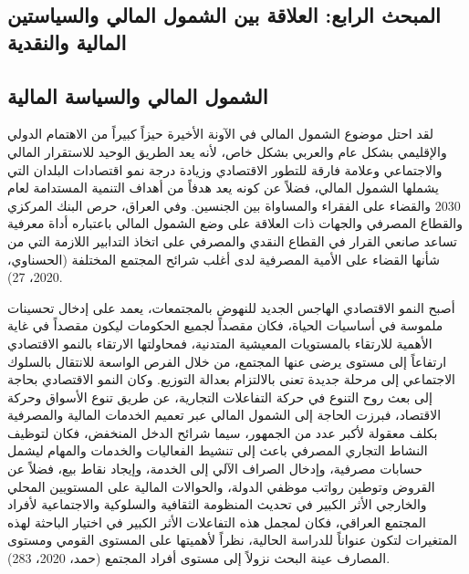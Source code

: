 \documentclass[10pt,a4paper]{report}
\begin{document}
\begin{doublespacing}
\section{المبحث الرابع: العلاقة بين الشمول المالي والسياستين المالية والنقدية}
\subsection{الشمول المالي والسياسة المالية}
لقد احتل موضوع الشمول المالي في الآونة الأخيرة حيزاً كبيراً من الاهتمام الدولي والإقليمي بشكل عام والعربي بشكل خاص، لأنه يعد الطريق الوحيد للاستقرار المالي والاجتماعي وعلامة فارقة للتطور الاقتصادي وزيادة درجة نمو اقتصادات البلدان التي يشملها الشمول المالي، فضلاً عن كونه يعد هدفاً من أهداف التنمية المستدامة لعام 2030 والقضاء على الفقراء والمساواة بين الجنسين. وفي العراق، حرص البنك المركزي والقطاع المصرفي والجهات ذات العلاقة على وضع الشمول المالي باعتباره أداة معرفية تساعد صانعي القرار في القطاع النقدي والمصرفي على اتخاذ التدابير اللازمة التي من شأنها القضاء على الأمية المصرفية لدى أغلب شرائح المجتمع المختلفة ({الحسناوي، 2020، 27}).

أصبح النمو الاقتصادي الهاجس الجديد للنهوض بالمجتمعات، يعمد على إدخال تحسينات ملموسة في أساسيات الحياة، فكان مقصداً لجميع الحكومات ليكون مقصداً في غاية الأهمية للارتقاء بالمستويات المعيشية المتدنية، فمحاولتها الارتقاء بالنمو الاقتصادي ارتفاعاً إلى مستوى يرضى عنها المجتمع، من خلال الفرص الواسعة للانتقال بالسلوك الاجتماعي إلى مرحلة جديدة تعنى بالالتزام بعدالة التوزيع. وكان النمو الاقتصادي بحاجة إلى بعث روح التنوع في حركة التفاعلات التجارية، عن طريق تنوع الأسواق وحركة الاقتصاد، فبرزت الحاجة إلى الشمول المالي عبر تعميم الخدمات المالية والمصرفية بكلف معقولة لأكبر عدد من الجمهور، سيما شرائح الدخل المنخفض، فكان لتوظيف النشاط التجاري المصرفي باعث إلى تنشيط الفعاليات والخدمات والمهام ليشمل حسابات مصرفية، وإدخال الصراف الآلي إلى الخدمة، وإيجاد نقاط بيع، فضلاً عن القروض وتوطين رواتب موظفي الدولة، والحوالات المالية على المستويين المحلي والخارجي الأثر الكبير في تحديث المنظومة الثقافية والسلوكية والاجتماعية لأفراد المجتمع العراقي، فكان لمجمل هذه التفاعلات الأثر الكبير في اختيار الباحثة لهذه المتغيرات لتكون عنواناً للدراسة الحالية، نظراً لأهميتها على المستوى القومي ومستوى المصارف عينة البحث نزولاً إلى مستوى أفراد المجتمع ({حمد، 2020، 283}).

\end{doublespacing}
\end{document}
